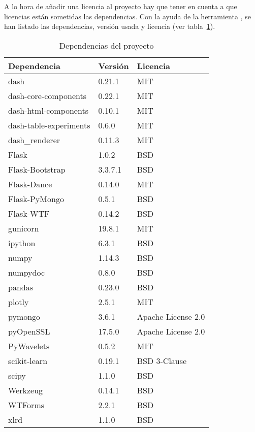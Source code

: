 A lo hora de añadir una licencia al proyecto hay que tener en cuenta a que 
licencias están sometidas las dependencias. Con la ayuda de la herramienta 
, se han listado las 
dependencias, versión usada y licencia (ver tabla~\ref{tab:dependencias}).

\begin{table}[]
	\centering
	\begin{tabular}{lll}
		\hline
		Dependencia            & Versión & Licencia           \\
		\hline
		dash                   & 0.21.1  & MIT                \\
		dash-core-components   & 0.22.1  & MIT                \\
		dash-html-components   & 0.10.1  & MIT                \\
		dash-table-experiments & 0.6.0   & MIT                \\
		dash\_renderer         & 0.11.3  & MIT                \\
		Flask                  & 1.0.2   & BSD                \\
		Flask-Bootstrap        & 3.3.7.1 & BSD                \\
		Flask-Dance            & 0.14.0  & MIT                \\
		Flask-PyMongo          & 0.5.1   & BSD                \\
		Flask-WTF              & 0.14.2  & BSD                \\
		gunicorn               & 19.8.1  & MIT                \\
		ipython                & 6.3.1   & BSD                \\
		numpy                  & 1.14.3  & BSD                \\
		numpydoc               & 0.8.0   & BSD                \\
		pandas                 & 0.23.0  & BSD                \\
		plotly                 & 2.5.1   & MIT                \\
		pymongo                & 3.6.1   & Apache License 2.0 \\
		pyOpenSSL              & 17.5.0  & Apache License 2.0 \\
		PyWavelets             & 0.5.2   & MIT                \\
		scikit-learn           & 0.19.1  & BSD 3-Clause       \\
		scipy                  & 1.1.0   & BSD                \\
		Werkzeug               & 0.14.1  & BSD                \\
		WTForms                & 2.2.1   & BSD                \\
		xlrd                   & 1.1.0   & BSD                \\
		\hline
	\end{tabular}
	\caption{Dependencias del proyecto}
	\label{tab:dependencias}
\end{table}

